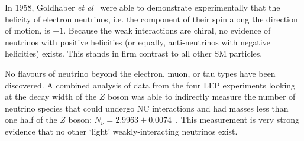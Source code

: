 In 1958, Goldhaber \textit{et al}~\cite{goldhaberHelicityNeutrinos1958} were able to demonstrate experimentally that the helicity of electron neutrinos, i.e. the component of their spin along the direction of motion, is $-1$. Because the weak interactions are chiral, no evidence of neutrinos with positive helicities (or equally, anti-neutrinos with negative helicities) exists. This stands in firm contrast to all other SM particles.

No flavours of neutrino beyond the electron, muon, or tau types have been discovered. A combined analysis of data from the four LEP experiments looking at the decay width of the $Z$ boson was able to indirectly measure the number of neutrino species that could undergo NC interactions and had masses less than one half of the $Z$ boson: $N_{\nu} = 2.9963\pm0.0074$~\cite{PrecisionElectroweakMeasurements2006,janotImprovedBhabhaCross2020}. %
This measurement is very strong evidence that no other `light' weakly-interacting neutrinos exist.



